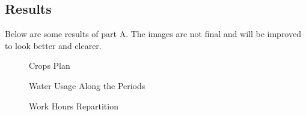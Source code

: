 \subsection{Results}
\label{sec:a2}

Below are some results of part A. The images are not final and will be improved to look better and clearer.

\begin{figure}
  \centering
  
  \caption{Crops Plan}
  \label{fig:a-crops}
\end{figure}

\begin{figure}
  \centering
  
  \caption{Water Usage Along the Periods}
  \label{fig:a-water}
\end{figure}

\begin{figure}
  \centering
  
  \caption{Work Hours Repartition}
  \label{fig:a-work}
\end{figure}

